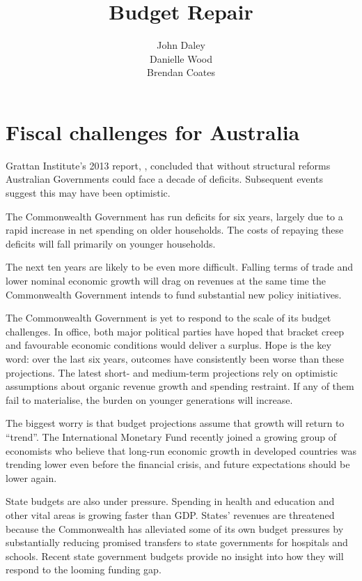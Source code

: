 \documentclass[twoside,english]{palatinob5portrait}
\title{\hfill Budget Repair}
\author{%
\hfill\begin{tabular}{@{}>{\raggedleft}p{0.98\linewidth}@{}}John Daley \tabularnewline[0.8\baselineskip] Danielle Wood \tabularnewline[0.8\baselineskip] Brendan Coates\end{tabular}%
}
\date{}
\begin{document}
\maketitle
\contentspage
\cleardoublepage\null
{}
\part{Fiscal challenges for Australia}\label{part:FISCAL}
\begin{overview}[-40pt]
Grattan Institute’s 2013 report, , concluded that without structural reforms Australian Governments could face a decade of deficits. Subsequent events suggest this may have been optimistic. 

The Commonwealth Government has run deficits for six years, largely due to a rapid increase in net spending on older households. The costs of repaying these deficits will fall primarily on younger households.

The next ten years are likely to be even more difficult. Falling terms of trade and lower nominal economic growth will drag on revenues at the same time the Commonwealth Government intends to fund substantial new policy initiatives. 

The Commonwealth Government is yet to respond to the scale of its budget challenges. In office, both major political parties have hoped that bracket creep and favourable economic conditions would deliver a surplus. Hope is the key word: over the last six years, outcomes have consistently been worse than these projections. The latest short- and medium-term projections rely on optimistic assumptions about organic revenue growth and spending restraint. If any of them fail to materialise, the burden on younger generations will increase. 

The biggest worry is that budget projections assume that growth will return to “trend”. The International Monetary Fund recently joined a growing group of economists who believe that long-run economic growth in developed countries was trending lower even before the financial crisis, and future expectations should be lower again.

State budgets are also under pressure. Spending in health and education and other vital areas is growing faster than GDP\@. States’ revenues are threatened because the Commonwealth has alleviated some of its own budget pressures by substantially reducing promised transfers to state governments for hospitals and schools. Recent state government budgets provide no insight into how they will respond to the looming funding gap. 


\end{overview}
\end{document}
